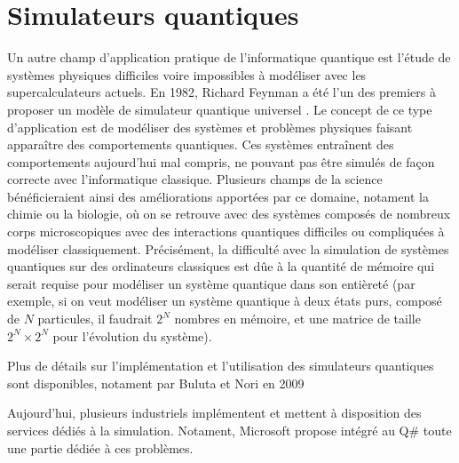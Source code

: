 \section{Simulateurs quantiques}

Un autre champ d'application pratique de l'informatique quantique est l'étude de systèmes physiques difficiles voire impossibles à modéliser avec les supercalculateurs actuels. En 1982, Richard Feynman a été l'un des premiers à proposer un modèle de simulateur quantique universel \cite{Feynman82}. Le concept de ce type d'application est de modéliser des systèmes et problèmes physiques faisant apparaître des comportements quantiques. Ces systèmes entraînent des comportements aujourd'hui mal compris, ne pouvant pas être simulés de façon correcte avec l'informatique classique. Plusieurs champs de la science bénéficieraient ainsi des améliorations apportées par ce domaine, notament la chimie ou la biologie, où on se retrouve avec des systèmes composés de nombreux corps microscopiques avec des interactions quantiques difficiles ou compliquées à modéliser classiquement. Précisément, la difficulté avec la simulation de systèmes quantiques sur des ordinateurs classiques est dûe à la quantité de mémoire qui serait requise pour modéliser un système quantique dans son entièreté (par exemple, si on veut modéliser un système quantique à deux états purs, composé de $N$ particules, il faudrait $2^N$ nombres en mémoire, et une matrice de taille $2^N \times 2^N$ pour l'évolution du système). 

Plus de détails sur l'implémentation et l'utilisation des simulateurs quantiques sont disponibles, notament par Buluta et Nori en 2009 \cite{Buluta2009}

Aujourd'hui, plusieurs industriels implémentent et mettent à disposition des services dédiés à la simulation. Notament, Microsoft propose intégré au Q\# toute une partie dédiée à ces problèmes. 